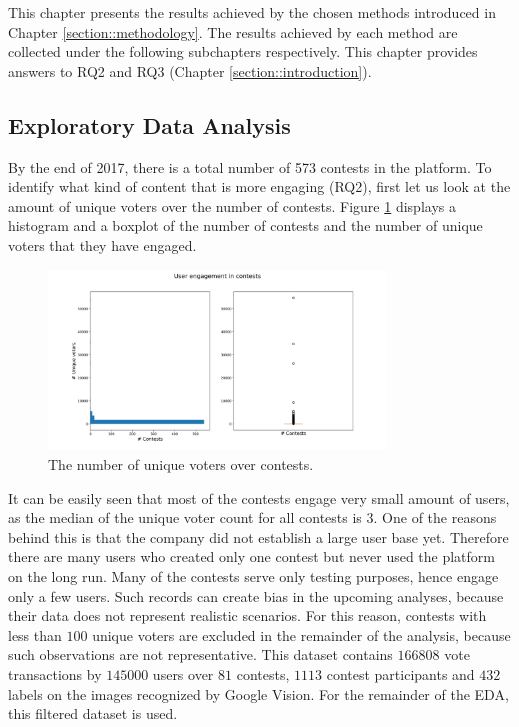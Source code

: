 This chapter presents the results achieved by the chosen methods introduced in Chapter \ref{section::methodology}. The results achieved by each method are collected under the following subchapters respectively. This chapter provides answers to RQ2 and RQ3 (Chapter \ref{section::introduction}).

\subsection{Exploratory Data Analysis}
\label{section::exploratory-data-analysis}
    By the end of 2017, there is a total number of 573 contests in the platform. To identify what kind of content that is more engaging (RQ2), first let us look at the amount of unique voters over the number of contests. Figure \ref{user_engagement_in_contests} displays a histogram and a boxplot of the number of contests and the number of unique voters that they have engaged. 
    
    \begin{figure}[h] 
        \begin{center}
            \includegraphics[width=0.8\textwidth]{Images/user_engagement_in_contests.png}
            \caption{The number of unique voters over contests.}
            \label{user_engagement_in_contests}
        \end{center}
    \end{figure}

    It can be easily seen that most of the contests engage very small amount of users, as the median of the unique voter count for all contests is 3. One of the reasons behind this is that the company did not establish a large user base yet. Therefore there are many users who created only one contest but never used the platform on the long run. Many of the contests serve only testing purposes, hence engage only a few users. Such records can create bias in the upcoming analyses, because their data does not represent realistic scenarios. For this reason, contests with less than $100$ unique voters are excluded in the remainder of the analysis, because such observations are not representative. This dataset contains $166 808$ vote transactions by $145 000$ users over $81$ contests, $1 113$ contest participants and $432$ labels on the images recognized by Google Vision. For the remainder of the EDA, this filtered dataset is used.

